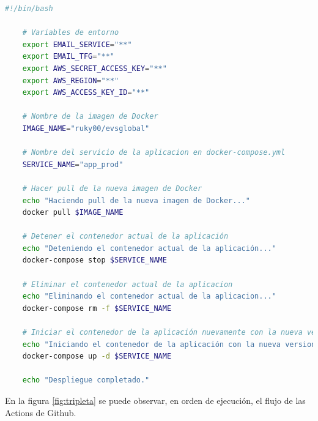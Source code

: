 \begin{lstlisting}[language=Bash, caption=Script de automatización de CD, label=lst:autoCD]
    #!/bin/bash

    # Variables de entorno
    export EMAIL_SERVICE="**"
    export EMAIL_TFG="**"
    export AWS_SECRET_ACCESS_KEY="**"
    export AWS_REGION="**"
    export AWS_ACCESS_KEY_ID="**"

    # Nombre de la imagen de Docker
    IMAGE_NAME="ruky00/evsglobal"

    # Nombre del servicio de la aplicacion en docker-compose.yml
    SERVICE_NAME="app_prod"

    # Hacer pull de la nueva imagen de Docker
    echo "Haciendo pull de la nueva imagen de Docker..."
    docker pull $IMAGE_NAME

    # Detener el contenedor actual de la aplicación
    echo "Deteniendo el contenedor actual de la aplicación..."
    docker-compose stop $SERVICE_NAME

    # Eliminar el contenedor actual de la aplicacion
    echo "Eliminando el contenedor actual de la aplicacion..."
    docker-compose rm -f $SERVICE_NAME

    # Iniciar el contenedor de la aplicación nuevamente con la nueva versión de la imagen
    echo "Iniciando el contenedor de la aplicación con la nueva version de la imagen..."
    docker-compose up -d $SERVICE_NAME

    echo "Despliegue completado."
    \end{lstlisting}
\newpage
En la figura \ref{fig:tripleta} se puede observar, en orden de ejecución, el flujo de las Actions de Github.
